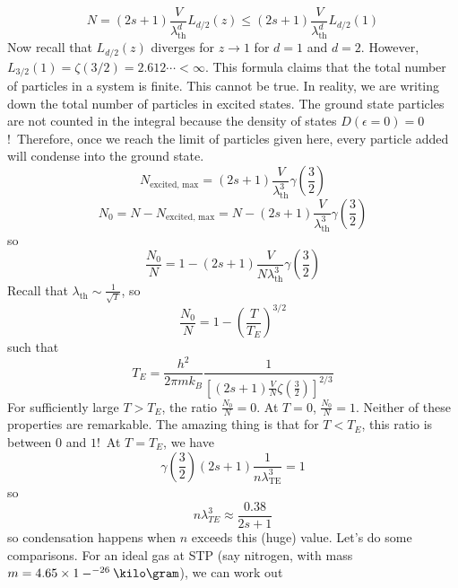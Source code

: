 \documentclass[a4paper,twoside,master.tex]{subfiles}
\begin{document}
\begin{equation}
    N = (2s+1) \frac{V}{\lambda_{\text{th}}^d} L_{d/2}(z) \leq (2s+1) \frac{V}{\lambda_{\text{th}}^d} L_{d/2}(1)
\end{equation}
Now recall that $ L_{d/2}(z) $ diverges for $ z \to 1 $ for $ d = 1 $ and $ d = 2 $. However, $ L_{3/2}(1) = \zeta(3/2) = 2.612\cdots < \infty $. This formula claims that the total number of particles in a system is finite. This cannot be true. In reality, we are writing down the total number of particles in excited states. The ground state particles are not counted in the integral because the density of states $ D(\epsilon = 0) = 0 $!\ Therefore, once we reach the limit of particles given here, every particle added will condense into the ground state.
\begin{equation}
    N_{\text{excited, max}} = (2s+1) \frac{V}{\lambda_{\text{th}}^3} \gamma\left( \frac{3}{2} \right)
\end{equation}
\begin{equation}
    N_0 = N - N_{\text{excited, max}} = N - (2s+1) \frac{V}{\lambda_{\text{th}}^3} \gamma\left( \frac{3}{2} \right)
\end{equation}
so
\begin{equation}
    \frac{N_0}{N} = 1 - (2s+1) \frac{V}{N\lambda_{\text{th}}^3} \gamma\left( \frac{3}{2} \right)
\end{equation}
Recall that $ \lambda_{\text{th}} \sim \frac{1}{\sqrt{T}} $, so
\begin{equation}
    \frac{N_0}{N} = 1 - \left( \frac{T}{T_E} \right)^{3/2}
\end{equation}
such that
\begin{equation}
    T_E = \frac{h^2}{2 \pi m k_B} \frac{1}{\left[ (2s+1) \frac{V}{N} \zeta \left( \frac{3}{2} \right) \right]^{2/3}}
\end{equation}
For sufficiently large $ T > T_E $, the ratio $ \frac{N_0}{N} = 0 $. At $ T = 0 $, $ \frac{N_0}{N} = 1 $. Neither of these properties are remarkable. The amazing thing is that for $ T < T_E $, this ratio is between $ 0 $ and $ 1 $!\ At $ T = T_E $, we have
\begin{equation}
    \gamma \left( \frac{3}{2} \right) (2s+1) \frac{1}{n \lambda_{\text{TE}}^3} = 1
\end{equation}
so
\begin{equation}
    n \lambda_{TE}^3 \approx \frac{0.38}{2s+1}
\end{equation}
so condensation happens when $ n $ exceeds this (huge) value. Let's do some comparisons. For an ideal gas at STP (say nitrogen, with mass $ m = 4.65 \times 1-^{-26} \kilo\gram $), we can work out
\end{document}
